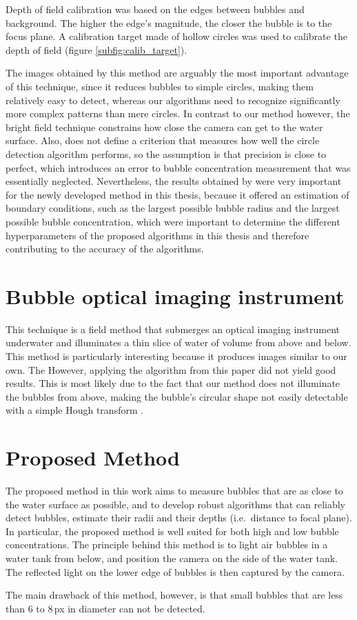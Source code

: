 	Depth of field calibration was based on the edges between bubbles and background. The higher the edge's magnitude, the closer the bubble is to the focus plane. A calibration target made of hollow circles was used to calibrate the depth of field (figure \ref{subfig:calib_target}). 
	
	The images obtained by this method are arguably the most important advantage of this technique, since it reduces bubbles to simple circles, making them relatively easy to detect, whereas our algorithms need to recognize significantly more complex patterns than mere circles.
	 In contrast to our method however, the bright field technique constrains how close the camera can get to the water surface. Also, \citet{Leonie} does not define a criterion that measures how well the circle detection algorithm performs, so the assumption is that precision is close to perfect, which introduces an error to bubble concentration measurement that was essentially neglected. 
	 Nevertheless, the results obtained by \citet{Leonie} were very important for the newly developed method in this thesis, because it offered an estimation of boundary conditions, such as the largest possible bubble radius and the largest possible bubble concentration, which were important to determine the different hyperparameters of the proposed algorithms in this thesis and therefore contributing to the accuracy of the algorithms. 
	
	
\section{Bubble optical imaging instrument}
	This technique is a field method that submerges an optical imaging instrument underwater and illuminates a thin slice	of water of volume from above and below. 
	This method is particularly interesting because it produces images similar to our own. The
	However, applying the algorithm from this paper did not yield good results. This is most likely due to the fact that our method does not illuminate the bubbles from above, making the bubble's circular shape not easily detectable with a simple Hough transform \citep{Hough1972}.


\section{Proposed Method}
The proposed method in this work aims to measure bubbles that are as close to the water surface as possible, and to develop robust algorithms that can reliably detect bubbles, estimate their radii and their depths (i.e.\ distance to focal plane). In particular, the proposed method is well suited for both high and low bubble concentrations. 
The principle behind this method is to light air bubbles in a water tank from below, and position the camera on the side of the water tank. The reflected light on the lower edge of bubbles is then captured by the camera. 

The main drawback of this method, however, is that small bubbles that are less than 6 to 8\,px in diameter can not be detected. 



















